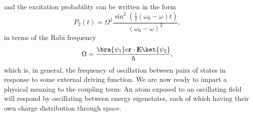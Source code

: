 	and the excitation probability can be written in the form \cite{FootAtomic,BinneyBook}
	\begin{equation}
		P_2(t) = \Omega^2 \frac{\sin^2(\frac{1}{2}(\omega_0-\omega)t)}{(\omega_0-\omega)^2},
		\label{eqn:transition_prob}
	\end{equation}
	in terms of the Rabi frequency
	\begin{equation}
		\Omega = \frac{\bra{\psi_1}e\textbf{r}\cdot\textbf{E}\ket{\psi_2}}{\hbar},
	\end{equation}
	which is, in general, the frequency of oscillation between pairs of states in response to some external driving function.
	We are now ready to impart a physical meaning to the coupling term: An atom exposed to an oscillating field will respond by oscillating between energy eigenstates, each of which having their own charge distribution through space.
	
